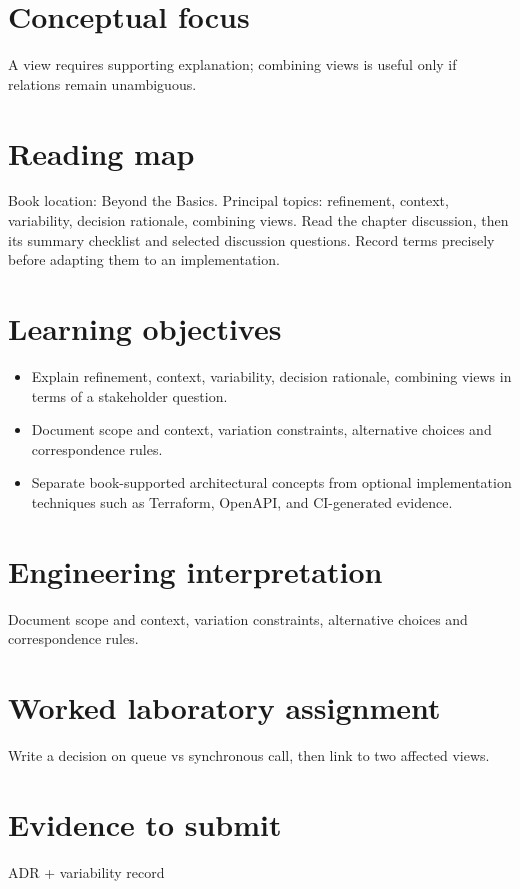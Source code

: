 \documentclass[10pt,letterpaper]{article}
\begin{document}
\DocProvenance
\section{Conceptual focus}
A view requires supporting explanation; combining views is useful only if relations remain unambiguous.

\section{Reading map}
Book location: Beyond the Basics. Principal topics: refinement, context, variability, decision rationale, combining views. Read the chapter discussion, then its summary checklist and selected discussion questions. Record terms precisely before adapting them to an implementation.

\section{Learning objectives}
\begin{itemize}
\item Explain refinement, context, variability, decision rationale, combining views in terms of a stakeholder question.
\item Document scope and context, variation constraints, alternative choices and correspondence rules.
\item Separate book-supported architectural concepts from optional implementation techniques such as Terraform, OpenAPI, and CI-generated evidence.
\end{itemize}
\section{Engineering interpretation}
Document scope and context, variation constraints, alternative choices and correspondence rules.

\section{Worked laboratory assignment}
Write a decision on queue vs synchronous call, then link to two affected views.

\section{Evidence to submit}
ADR + variability record
\end{document}
